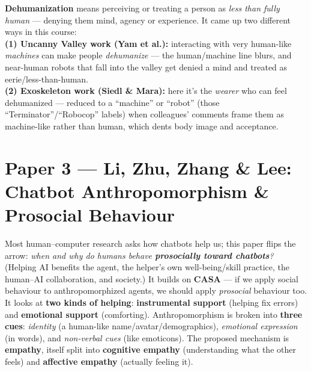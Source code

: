 \documentclass[11pt, oneside]{book}
\begin{document}
\begin{notebox}[title={Dehumanization — shows up in \emph{two} senses (open-question favourite)}]
\textbf{Dehumanization} means perceiving or treating a person as \emph{less
than fully human} — denying them mind, agency or experience. It came up two
different ways in this course:\\
\textbf{(1) Uncanny Valley work (Yam et al.):} interacting with very human-like
\emph{machines} can make people \emph{dehumanize} — the human/machine line
blurs, and near-human robots that fall into the valley get denied a mind and
treated as eerie/less-than-human.\\
\textbf{(2) Exoskeleton work (Siedl \& Mara):} here it's the \emph{wearer} who
can feel dehumanized — reduced to a ``machine'' or ``robot'' (those
``Terminator''/``Robocop'' labels) when colleagues' comments frame them as
machine-like rather than human, which dents body image and acceptance.
\end{notebox}

\section{Paper 3 — Li, Zhu, Zhang \& Lee: Chatbot Anthropomorphism \& Prosocial Behaviour}

Most human–computer research asks how chatbots help us; this paper flips the
arrow: \emph{when and why do humans behave \textbf{prosocially toward
chatbots}?} (Helping AI benefits the agent, the helper's own
well-being/skill practice, the human–AI collaboration, and society.) It builds
on \textbf{CASA} — if we apply social behaviour to anthropomorphized agents, we
should apply \emph{prosocial} behaviour too. It looks at \textbf{two kinds of
helping}: \textbf{instrumental support} (helping fix errors) and
\textbf{emotional support} (comforting). Anthropomorphism is broken into
\textbf{three cues}: \emph{identity} (a human-like name/avatar/demographics),
\emph{emotional expression} (in words), and \emph{non-verbal cues} (like
emoticons). The proposed mechanism is \textbf{empathy}, itself split into
\textbf{cognitive empathy} (understanding what the other feels) and
\textbf{affective empathy} (actually feeling it).
\end{document}
